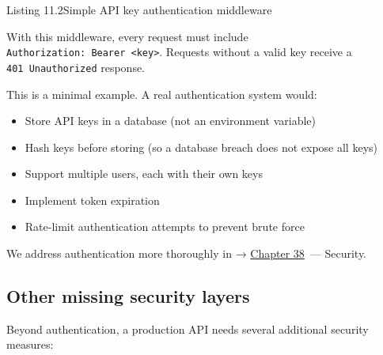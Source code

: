 \begin{codeboxcap}{\textcolor{accent}{Listing 11.2}\enspace Simple API key authentication middleware}
\begin{Shaded}
\begin{Highlighting}[]
        \OperatorTok{*}\OperatorTok{**}

\NormalTok{(}\OperatorTok{=}\NormalTok{[}\NormalTok{])}

\NormalTok{(}\OperatorTok{=}\NormalTok{[}\NormalTok{])}
\end{Highlighting}
\end{Shaded}

\end{codeboxcap}

\noindent{}With this middleware, every request must include \texttt{Authorization:}\allowbreak{}\texttt{\ Bearer\ \textless{}key\textgreater{}}. Requests without a valid key receive a \texttt{401\ Unauthorized} response.

This is a minimal example. A real authentication system would:

\begin{itemize}
\tightlist
\item
  Store API keys in a database (not an environment variable)
\item
  Hash keys before storing (so a database breach does not expose all keys)
\item
  Support multiple users, each with their own keys
\item
  Implement token expiration
\item
  Rate-limit authentication attempts to prevent brute force
\end{itemize}

\noindent{}We address authentication more thoroughly in → \hyperref[ch:38-security]{Chapter 38}~--- Security.

\subsection*{Other missing security layers}\label{11-reliability-security-gaps:other-missing-security-layers}

Beyond authentication, a production API needs several additional security measures:

